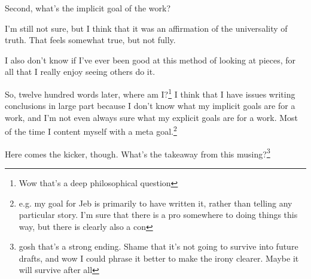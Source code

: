 \documentclass[12pt]{article}[titlepage]
\newcommand{\1}{\={a}}
\newcommand{\2}{\={e}}
\newcommand{\3}{\={\i}}
\newcommand{\4}{\=o}
\newcommand{\5}{\=u}
\newcommand{\6}{\={A}}
\renewcommand{\,}{\textsuperscript{,}}
\begin{document}
Second, what's the implicit goal of the work?

I'm still not sure, but I think that it was an affirmation of the universality of truth.
That feels somewhat true, but not fully.

I also don't know if I've ever been good at this method of looking at pieces, for all that I really enjoy seeing others do it.

So, twelve hundred words later, where am I?\footnote{Wow that's a deep philosophical question}
I think that I have issues writing conclusions in large part because I don't know what my implicit goals are for a work, and I'm not even always sure what my explicit goals are for a work.
Most of the time I content myself with a meta goal.\footnote{e.g. my goal for Jeb is primarily to have written it, rather than telling any particular story.
I'm sure that there is a pro somewhere to doing things this way, but there is clearly also a con}

Here comes the kicker, though.
What's the takeaway from this musing?\footnote{gosh that's a strong ending. Shame that it's not going to survive into future drafts, and wow I could phrase it better to make the irony clearer. Maybe it will survive after all}
\end{document}
